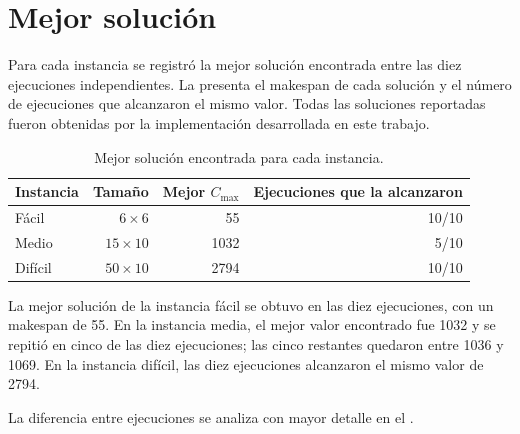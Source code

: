 \chapter{Mejor solución}
\label{ch:mejor_solucion}

Para cada instancia se registró la mejor solución encontrada entre las diez ejecuciones independientes.
La  presenta el makespan de cada solución y el número de ejecuciones que alcanzaron el mismo valor.
Todas las soluciones reportadas fueron obtenidas por la implementación desarrollada en este trabajo.

\begin{table}[htbp]
\centering
\begin{tabular}{lrrr}
\toprule
Instancia & Tamaño & Mejor \(C_{\max}\) & Ejecuciones que la alcanzaron \\
\midrule
Fácil   & \(6\times6\)   & 55   & 10/10 \\
Medio   & \(15\times10\) & 1032 & 5/10 \\
Difícil & \(50\times10\) & 2794 & 10/10 \\
\bottomrule
\end{tabular}
\caption{Mejor solución encontrada para cada instancia.}
\label{tab:mejor_solucion}
\end{table}

La mejor solución de la instancia fácil se obtuvo en las diez ejecuciones,
con un makespan de 55. En la instancia media, el mejor valor encontrado fue 1032
y se repitió en cinco de las diez ejecuciones;
las cinco restantes quedaron entre 1036 y 1069.
En la instancia difícil, las diez ejecuciones alcanzaron el mismo valor de 2794.

La diferencia entre ejecuciones se analiza con mayor detalle en el .

